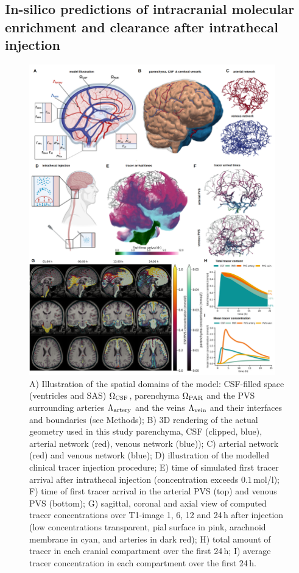 \documentclass[fleqn,10pt]{wlscirep}
\newcommand{\mer}[1]{\textcolor{magenta}{#1}}
\begin{document}
\subsection*{In-silico predictions of intracranial molecular enrichment and clearance after intrathecal injection}
\begin{figure}
    \centering
    \includegraphics[width=0.95\textwidth]{figures/figure1.png}
     \caption{A) Illustration of the spatial domains of the model: CSF-filled space (ventricles and SAS) $\Omega_{\rm CSF}$, parenchyma $\Omega_{\rm PAR}$ and the PVS surrounding arteries $\Lambda_{\rm artery}$ and the veins $\Lambda_{\rm vein}$ and their interfaces and boundaries (see Methods); B) 3D rendering of the actual geometry used in this study parenchyma, CSF (clipped, blue), arterial network (red), venous network (blue)); C) arterial network (red) and venous network (blue); D) illustration of the modelled clinical tracer injection procedure; E) time of simulated first tracer arrival after intrathecal injection (concentration exceeds $0.1\,$mol/l); F) time of first tracer arrival in the arterial PVS (top) and venous PVS (bottom); G) sagittal, coronal and axial view of computed tracer concentrations over T1-image 1, 6, 12 and 24\,h after injection (low concentrations transparent, pial surface in pink, arachnoid membrane in cyan, and arteries in dark red); H) total amount of tracer in each cranial compartment over the first 24\,h; I) average tracer concentration in each compartment over the first 24\,h. }
     \label{fig:results1}
\end{figure}
\end{document}
